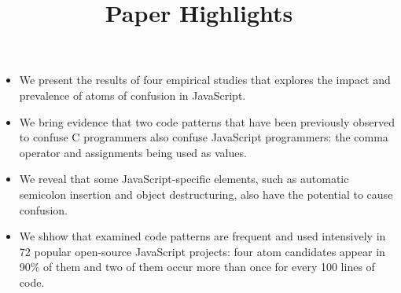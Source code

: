 \documentclass{article}
\title{Paper Highlights}
\begin{document}
\maketitle

\begin{itemize}

\item We present the results of four empirical studies that explores the impact and
  prevalence of atoms of confusion in JavaScript.

\item We bring evidence that two code patterns that have been previously observed to confuse C
  programmers also confuse JavaScript programmers: the comma operator and assignments being used as values.

\item We reveal that some JavaScript-specific elements, such as automatic semicolon insertion and object destructuring,
  also have the potential to cause confusion.

\item We shhow that examined code patterns are frequent and used intensively in 72 popular open-source JavaScript projects:
  four atom candidates appear in 90\% of them and two of them occur more than once for every 100 lines of code.

\end{itemize}
\end{document}
